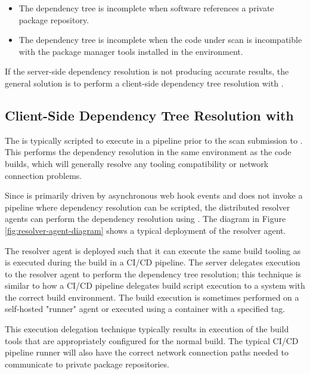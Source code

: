 \begin{itemize}
  \item The dependency tree is incomplete when software references a private package repository.
  \item The dependency tree is incomplete when the code under scan is incompatible with the 
  package manager tools installed in the \cxone environment.
\end{itemize}

If the server-side dependency resolution is not producing accurate results, the general solution is to
perform a client-side dependency tree resolution with \scaresolver. 

\subsection{Client-Side Dependency Tree Resolution with \scaresolver}

The \scaresolver is typically scripted to execute in
a pipeline prior to the scan submission to \cxone.  This performs the dependency resolution
in the same environment as the code builds, which will generally resolve any tooling compatibility or network connection
problems.  

Since \cxoneflow is primarily driven by asynchronous web hook events and does not invoke a pipeline
where dependency resolution can be scripted, the distributed resolver agents can perform the dependency resolution using
\scaresolver. The diagram in Figure \ref{fig:resolver-agent-diagram} shows a typical deployment of the resolver agent.  


The resolver agent is deployed such that it can execute the same build tooling as is executed during the build
in a CI/CD pipeline. The \cxoneflow server delegates \scaresolver execution to the resolver agent to perform the dependency tree
resolution; this technique is similar to how a CI/CD pipeline delegates build script execution to a system with the correct
build environment.  The build execution is sometimes performed on a self-hosted "runner" agent or executed using a container with a specified tag. 

This execution delegation technique typically results in execution of the build tools that are appropriately
configured for the normal build.  The typical CI/CD pipeline runner will also have the correct network connection paths
needed to communicate to private package repositories.


